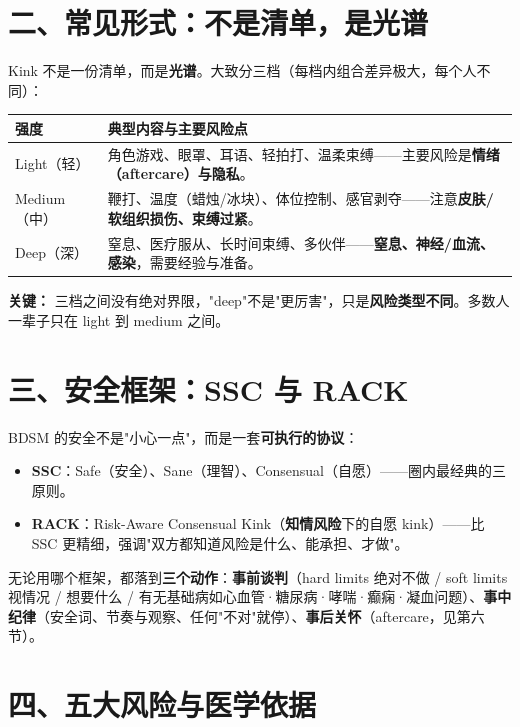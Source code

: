\documentclass[12pt,UTF8,openany]{ctexbook}
\begin{document}
\section{二、常见形式：不是清单，是光谱}

Kink 不是一份清单，而是\textbf{光谱}。大致分三档（每档内组合差异极大，每个人不同）：

\begin{tabularx}{\textwidth}{lX}
\toprule
\textbf{强度} & \textbf{典型内容与主要风险点} \\
\midrule
Light（轻） & 角色游戏、眼罩、耳语、轻拍打、温柔束缚——主要风险是\textbf{情绪（aftercare）与隐私}。 \\
Medium（中） & 鞭打、温度（蜡烛/冰块）、体位控制、感官剥夺——注意\textbf{皮肤/软组织损伤、束缚过紧}。 \\
Deep（深） & 窒息、医疗服从、长时间束缚、多伙伴——\textbf{窒息、神经/血流、感染}，需要经验与准备。 \\
\bottomrule
\end{tabularx}

\vspace{0.5em}
\noindent\textbf{关键：} 三档之间没有绝对界限，"deep"不是"更厉害"，只是\textbf{风险类型不同}。多数人一辈子只在 light 到 medium 之间。

\section{三、安全框架：SSC 与 RACK}

BDSM 的安全不是"小心一点"，而是一套\textbf{可执行的协议}：

\begin{itemize}
  \item \textbf{SSC}：Safe（安全）、Sane（理智）、Consensual（自愿）——圈内最经典的三原则。
  \item \textbf{RACK}：Risk-Aware Consensual Kink（\textbf{知情风险}下的自愿 kink）——比 SSC 更精细，强调"双方都知道风险是什么、能承担、才做"。
\end{itemize}

无论用哪个框架，都落到\textbf{三个动作}：\textbf{事前谈判}（hard limits 绝对不做 / soft limits 视情况 / 想要什么 / 有无基础病如心血管·糖尿病·哮喘·癫痫·凝血问题）、\textbf{事中纪律}（安全词、节奏与观察、任何"不对"就停）、\textbf{事后关怀}（aftercare，见第六节）。

\section{四、五大风险与医学依据}
\end{document}
